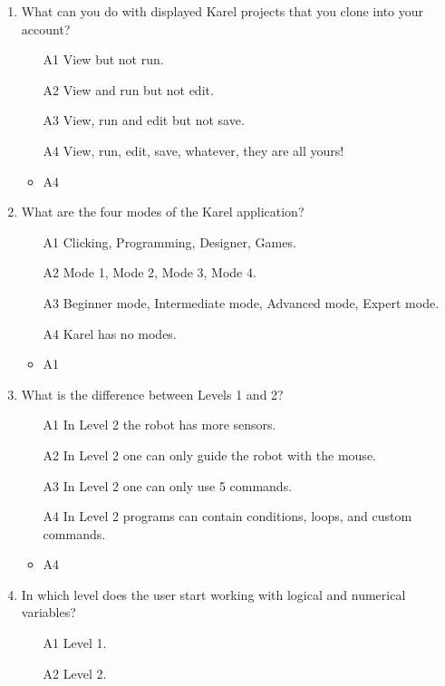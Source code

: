 \documentclass[article,A4,12pt]{llncs}
\begin{document}
\begin{enumerate}
\item What can you do with displayed Karel projects that you clone into your account?
\begin{enumerate}
\item[A1] View but not run.
\item[A2] View and run but not edit.
\item[A3] View, run and edit but not save.
\item[A4] View, run, edit, save, whatever, they are all yours!
\end{enumerate}
  \begin{itemize}
    \item A4
  \end{itemize}
\item What are the four modes of the Karel application?
\begin{enumerate}
\item[A1] Clicking, Programming, Designer, Games.
\item[A2] Mode 1, Mode 2, Mode 3, Mode 4.
\item[A3] Beginner mode, Intermediate mode, Advanced mode, Expert mode.
\item[A4] Karel has no modes.
\end{enumerate}
  \begin{itemize}
    \item A1
  \end{itemize}
\item What is the difference between Levels 1 and 2?
\begin{enumerate}
\item[A1] In Level 2 the robot has more sensors. 
\item[A2] In Level 2 one can only guide the robot with the mouse.
\item[A3] In Level 2 one can only use 5 commands.
\item[A4] In Level 2 programs can contain conditions, loops, and custom commands. 
\end{enumerate}
  \begin{itemize}
    \item A4
  \end{itemize}
\item In which level does the user start working with logical and numerical variables?
\begin{enumerate}
\item[A1] Level 1.
\item[A2] Level 2.

\end{enumerate}
\end{enumerate}
\end{document}
